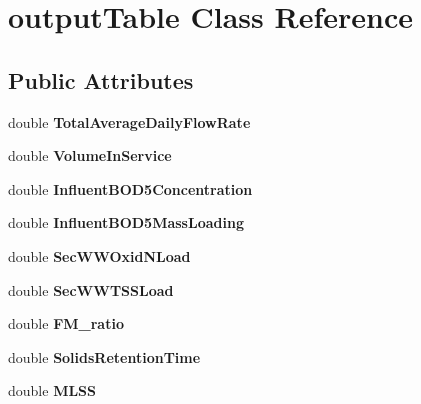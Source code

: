 \hypertarget{classoutput_table}{}\section{output\+Table Class Reference}
\label{classoutput_table}
\subsection*{Public Attributes}
\begin{DoxyCompactItemize}
\item 
\mbox{\label{classoutput_table_a94cd344fd2d2259db84c847ed7d3b9d0}} 
double {\bfseries Total\+Average\+Daily\+Flow\+Rate}
\item 
\mbox{\label{classoutput_table_a23546477327afa789f950359f6bc5a26}} 
double {\bfseries Volume\+In\+Service}
\item 
\mbox{\label{classoutput_table_a2d4d6f9b81ac3f82353df544051eff29}} 
double {\bfseries Influent\+B\+O\+D5\+Concentration}
\item 
\mbox{\label{classoutput_table_a63d98e83a20075318c220dbb4d4e3381}} 
double {\bfseries Influent\+B\+O\+D5\+Mass\+Loading}
\item 
\mbox{\label{classoutput_table_a49c74aebd79d77ba70f9915fce6054da}} 
double {\bfseries Sec\+W\+W\+Oxid\+N\+Load}
\item 
\mbox{\label{classoutput_table_a83a48db5fdf9549a73db5df398776b25}} 
double {\bfseries Sec\+W\+W\+T\+S\+S\+Load}
\item 
\mbox{\label{classoutput_table_a88664ad4cbde831e49d04837913bf9be}} 
double {\bfseries F\+M\+\_\+ratio}
\item 
\mbox{\label{classoutput_table_a412fa2fd85242c50034a7d246e870b1a}} 
double {\bfseries Solids\+Retention\+Time}
\item 
\mbox{\label{classoutput_table_a0f514390f392fe24bb88c7b494c81705}} 
double {\bfseries M\+L\+SS}
\item 

\end{DoxyCompactItemize}
